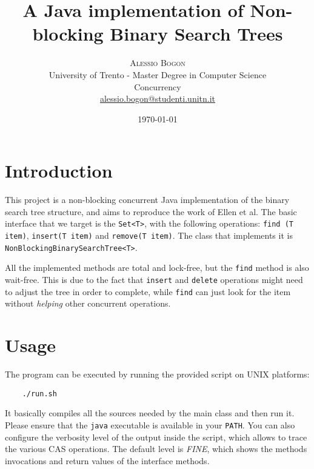 \documentclass[a4paper,draft,12pt]{article}
\title{\textbf{A Java implementation of Non-blocking Binary Search Trees}} %
\author{
    \textsc{Alessio Bogon}\\[2mm] %
    \normalsize University of Trento - Master Degree in Computer Science\\ %
    \normalsize Concurrency\\
    \href{mailto:alessio.bogon@studenti.unitn.it}{alessio.bogon@studenti.unitn.it} %
}
\date{\today}
\begin{document}
\maketitle


\section{Introduction} %
\label{sec:introduction}
This project is a non-blocking concurrent Java implementation of the binary search tree structure, and aims to reproduce the work of Ellen et al\cite{ellen10}.
The basic interface that we target is the \texttt{Set<T>}, with the following operations: \texttt{find (T item)}, \texttt{insert(T item)} and \texttt{remove(T item)}.
The class that implements it is \texttt{Non\-Blocking\-Binary\-Search\-Tree\-<T>}.

All the implemented methods are total and lock-free, but the \texttt{find} method is also wait-free.
This is due to the fact that \texttt{insert} and \texttt{delete} operations might need to adjust the tree in order to complete, while \texttt{find} can just look for the item without \emph{helping} other concurrent operations.



\section{Usage} %
\label{sec:usage}
The program can be executed by running the provided script on UNIX platforms:
\begin{verbatim}
    ./run.sh
\end{verbatim}
It basically compiles all the sources needed by the main class and then run it.
Please ensure that the \texttt{java} executable is available in your \texttt{PATH}.
You can also configure the verbosity level of the output inside the script, which allows to trace the various \ac{CAS} operations.
The default level is \emph{FINE}, which shows the methods invocations and return values of the interface methods.
\end{document}
